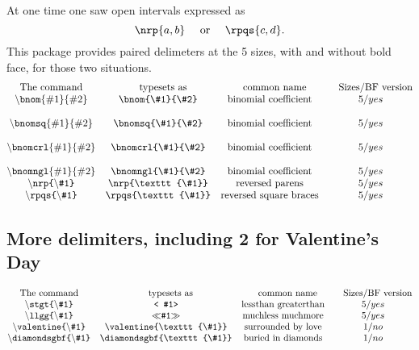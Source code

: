 \documentclass{amsart}
\begin{document}
 At one time one saw open intervals expressed as
 \[
 \nrp{a,b} \quad\text{ or }\quad \rpqs{c,d}.
 \]
 This package provides paired delimeters at the 5 sizes,
  with and without bold face, for those two
 situations.
 \begin{equation*}
 \begin{matrix}
\text{The command}&	\quad\text{ typesets as }&\quad \text{common name}&\quad \text{Sizes/BF version}\\
 \texttt{$\backslash$bnom$\{\#1\}\{\#2\}$}&\bnom{\#1}{\#2}&\text{binomial coefficient}&5/yes\\\\
 \texttt{$\backslash$bnomsq$\{\#1\}\{\#2\}$}&\bnomsq{\#1}{\#2}&\text{binomial coefficient}&5/yes\\\\
 \texttt{$\backslash$bnomcrl$\{\#1\}\{\#2\}$}&\bnomcrl{\#1}{\#2}&\text{binomial coefficient}&5/yes\\\\
 \texttt{$\backslash$bnomngl$\{\#1\}\{\#2\}$}&\bnomngl{\#1}{\#2}&\text{binomial coefficient}&5/yes
 \\
 \texttt{$\backslash$nrp\{$\backslash$\#1\}} &\nrp{\texttt{\#1}}& \text{reversed parens}&5/yes\\
\texttt{$\backslash$rpqs\{$\backslash$\#1\}} & \rpqs{\texttt{\#1}}&\text{reversed square braces}&5/yes
 \end{matrix}
 \end{equation*}

 
\subsection{More delimiters, including 2 for Valentine's Day}
 \begin{equation*}
 \begin{matrix}
\text{The command}&	\quad\text{ typesets as }&\quad \text{common name}&\quad \text{Sizes/BF version}
 \\
\backslash\texttt{stgt\{$\backslash$\#1\}} &\texttt{< \#1>}     & \text{lessthan greaterthan}&5/yes\\
\backslash\texttt{llgg\{$\backslash$\#1\}} &\texttt{$\ll$\#1$\gg$}&\text{muchless muchmore}&5/yes\\
\backslash\texttt{valentine\{$\backslash$\#1\}}&\valentine{\texttt{\#1}} &\text{surrounded by love}&1/no\\
\backslash\texttt{diamondsgbf\{$\backslash$\#1\}}&\diamondsgbf{\texttt{\#1}}& \text{buried in diamonds}&1/no
 \end{matrix}
 \end{equation*}
\end{document}
